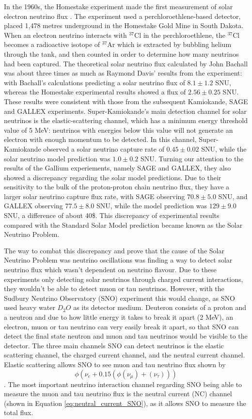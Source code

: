 In the 1960s, the Homestake experiment made the first measurement of solar electron neutrino flux \cite{homestake_davis}. The experiment used a perchloroethlene-based detector, placed 1,478 metres underground in the Homestake Gold Mine in South Dakota. When an electron neutrino interacts with ${ }^{37} \mathrm{Cl}$ in the perchloroethlene, the ${ }^{37} \mathrm{Cl}$ becomes a radioactive isotope of ${ }^{37} \mathrm{Ar}$ which is extracted by bubbling helium through the tank, and then counted in order to determine how many neutrinos had been captured. The theoretical solar neutrino flux calculated by John Bachall was about three times as much as Raymond Davis' results from the experiment: with Bachall's calculations predicting a solar neutrino flux of $8.1 \pm 1.2$ SNU, whereas the Homestake experimental results showed a flux of $2.56 \pm 0.25$ SNU. These results were consistent with those from the subsequent Kamiokande, SAGE and GALLEX experiments. Super-Kamiokande's main detection channel for solar neutrinos is the elastic-scattering channel, which has a minimum energy threshold value of 5 MeV: neutrinos with energies below this value will not generate an electron with enough momentum to be detected. In this channel, Super-Kamiokande observed a solar neutrino capture rate of $0.45 \pm 0.02$ SNU, while the solar neutrino model prediction was $1.0 \pm 0.2$ SNU. Turning our attention to the results of the Gallium experiements, namely SAGE and GALLEX, they also showed a discrepancy regarding the solar model predictions. Due to their sensitivity to the bulk of the proton-proton chain neutrino flux, they have a larger solar neutrino capture flux rate, with SAGE observing $70.8 \pm 5.0$ SNU, and GALLEX observing $77.5 \pm 8.0$ SNU, while the model prediction was $129 \pm 9.0$ SNU, a difference of about 40\$. This discrepancy of experimental results compared with the Standard Solar Model prediction became known as the Solar Neutrino Problem. 

The way to combat this discrepancy and prove that the cause of the Solar Neutrino Problem was neutrino oscillations was finding a way to detect solar neutrino flux which wasn't dependent on neutrino flavour. Due to these experiments only detecting solar neutrinos through charged current interactions, they wouldn't be able to detect muon or tau neutrinos. However, with the Sudbury Neutrino Observatory (SNO) experiment this would change, as SNO used heavy water $D_{2}O$ as its detector medium. Deuteron consists of a proton and a neutron and due to how little energy it takes to break it apart (2 MeV), an electron, muon or tau neutrino can very easily break it apart, so that SNO can detect the final state neutron and muon and tau neutrinos would be visible to the detector. The three main channels SNO can detect neutrinos is the elastic scattering channel, the charged current channel, and the neutral current channel. Elastic scattering allows SNO to see muon and tau neutrino flux shown by $$\phi(\nu_{e} + 0.15(\phi(\nu_{\mu}) + (\nu_{\tau})))$$. The most important neutrino interaction channel regarding SNO being able to measure the muon and tau neutrino flux is the neutral current (NC) channel (shown in Equation \ref{eq:neutral_current_SNO}), as it allows SNO to measure the total flux.

